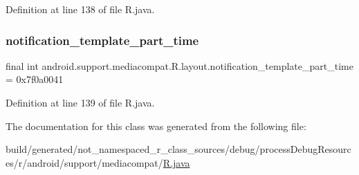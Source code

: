 Definition at line 138 of file R.\+java.

\mbox{\label{classandroid_1_1support_1_1mediacompat_1_1_r_1_1layout_ac483500984025c7db556bf3c6d4cfc49}} 
\subsubsection{\texorpdfstring{notification\_template\_part\_time}{notification\_template\_part\_time}}
{\footnotesize\ttfamily final int android.\+support.\+mediacompat.\+R.\+layout.\+notification\+\_\+template\+\_\+part\+\_\+time = 0x7f0a0041\hspace{0.3cm}{\ttfamily [static]}}



Definition at line 139 of file R.\+java.



The documentation for this class was generated from the following file\+:\begin{DoxyCompactItemize}
\item 
build/generated/not\+\_\+namespaced\+\_\+r\+\_\+class\+\_\+sources/debug/process\+Debug\+Resources/r/android/support/mediacompat/\mbox{\hyperlink{android_2support_2mediacompat_2_r_8java}{R.\+java}}\end{DoxyCompactItemize}

